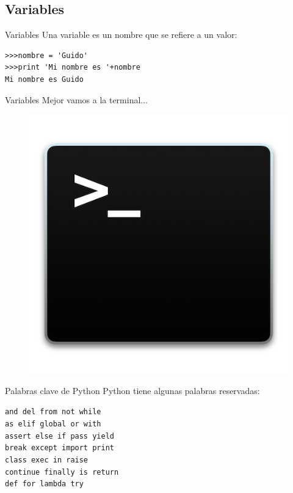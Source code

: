 \documentclass[11pt]{beamer}
\newcommand{\tab}[1][1cm]{\hspace*{#1}}
\begin{document}
\subsection{Variables}
\begin{frame}[fragile]{Variables}
Una variable es un nombre que se refiere a un valor:
\begin{verbatim}
>>>nombre = 'Guido'
>>>print 'Mi nombre es '+nombre
Mi nombre es Guido
\end{verbatim} 
\end{frame}

\begin{frame}{Variables}
Mejor vamos a la terminal...
\begin{figure}
\includegraphics[scale=0.5]{terminal.png}
\end{figure}
\end{frame}
\begin{frame}{Palabras clave de Python}
Python tiene algunas palabras reservadas:\\
\begin{center}
{\tt and   \tab    del   \tab    from   \tab   not  \tab     while\\
as   \tab     elif  \tab    global  \tab  or   \tab     with\\
assert  \tab  else   \tab   if    \tab    pass  \tab    yield\\
break   \tab  except  \tab  import  \tab  print\\
class  \tab   exec   \tab   in    \tab    raise\\
continue \tab finally \tab  is    \tab    return \\
def   \tab    for   \tab    lambda  \tab  try\\
}
\end{center}
\end{frame}
\end{document}
